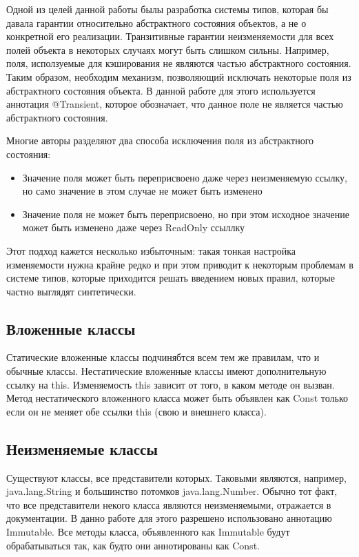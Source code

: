 Одной из целей данной работы былы разработка системы типов, которая бы давала гарантии относительно абстрактного состояния объектов, а не о конкретной его реализации. Транзитивные гарантии неизменяемости для всех полей объекта в некоторых случаях могут быть слишком сильны. Например, поля, исползуемые для кэширования не являются частью абстрактного состояния. Таким образом, необходим механизм, позволяющий исключать некоторые поля из абстрактного состояния объекта. В данной работе для этого используется аннотация @Transient, которое обозначает, что данное поле не является частью абстрактного состояния. 

Многие авторы разделяют два способа исключения поля из абстрактного состояния:
\begin{itemize}
\item{Значение поля может быть переприсвоено даже через неизменяемую ссылку, но само значение в этом случае не может быть изменено}
\item{Значение поля не может быть переприсвоено, но при этом исходное значение может быть изменено даже через ReadOnly ссыллку}
\end{itemize}
Этот подход кажется несколько избыточным: такая тонкая настройка изменяемости нужна крайне редко и при этом приводит к некоторым проблемам в системе типов, которые приходится решать введением новых правил, которые частно выглядят синтетически.

\subsection{Вложенные классы}

Статические вложенные классы подчинябтся всем тем же правилам, что и обычные классы. Нестатические вложенные классы имеют дополнительную ссылку на this. Изменяемость this зависит от того, в каком методе он вызван. Метод нестатического вложенного класса может быть объявлен как Const только если он не меняет обе ссылки this (свою и внешнего класса).

\subsection{Неизменяемые классы}

Существуют классы, все представители которых. Таковыми являются, например, java.lang.String и большинство потомков java.lang.Number. Обычно тот факт, что все представители некого класса являются неизменяемыми, отражается в документации. В данно работе для этого разрешено использовано аннотацию Immutable. Все методы класса, объявленного как Immutable будут обрабатываться так, как будто они аннотированы как Const.

